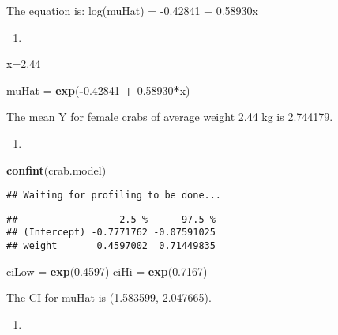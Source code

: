 \documentclass[
]{article}
\newenvironment{Shaded}{\begin{snugshade}}{\end{snugshade}}
\newcommand{\FloatTok}[1]{\textcolor[rgb]{0.00,0.00,0.81}{#1}}
\newcommand{\KeywordTok}[1]{\textcolor[rgb]{0.13,0.29,0.53}{\textbf{#1}}}
\newcommand{\NormalTok}[1]{#1}
\newcommand{\OperatorTok}[1]{\textcolor[rgb]{0.81,0.36,0.00}{\textbf{#1}}}
\newcommand{\StringTok}[1]{\textcolor[rgb]{0.31,0.60,0.02}{#1}}
\begin{document}
The equation is: log(muHat) = -0.42841 + 0.58930x

\begin{enumerate}
\def\labelenumi{\alph{enumi})}
\setcounter{enumi}{1}
\item
\end{enumerate}

\begin{Shaded}
\begin{Highlighting}[]
\NormalTok{x=}\FloatTok{2.44}

\NormalTok{muHat =}\StringTok{ }\KeywordTok{exp}\NormalTok{(}\OperatorTok{-}\FloatTok{0.42841} \OperatorTok{+}\StringTok{ }\FloatTok{0.58930}\OperatorTok{*}\NormalTok{x)}
\end{Highlighting}
\end{Shaded}

The mean Y for female crabs of average weight 2.44 kg is 2.744179.

\begin{enumerate}
\def\labelenumi{\alph{enumi})}
\setcounter{enumi}{2}
\item
\end{enumerate}

\begin{Shaded}
\begin{Highlighting}[]
\KeywordTok{confint}\NormalTok{(crab.model)}
\end{Highlighting}
\end{Shaded}

\begin{verbatim}
## Waiting for profiling to be done...
\end{verbatim}

\begin{verbatim}
##                  2.5 %      97.5 %
## (Intercept) -0.7771762 -0.07591025
## weight       0.4597002  0.71449835
\end{verbatim}

\begin{Shaded}
\begin{Highlighting}[]
\NormalTok{ciLow =}\StringTok{ }\KeywordTok{exp}\NormalTok{(}\FloatTok{0.4597}\NormalTok{)}
\NormalTok{ciHi =}\StringTok{ }\KeywordTok{exp}\NormalTok{(}\FloatTok{0.7167}\NormalTok{)}
\end{Highlighting}
\end{Shaded}

The CI for muHat is (1.583599, 2.047665).

\begin{enumerate}
\def\labelenumi{\alph{enumi})}
\setcounter{enumi}{3}
\item
\end{enumerate}
\end{document}
